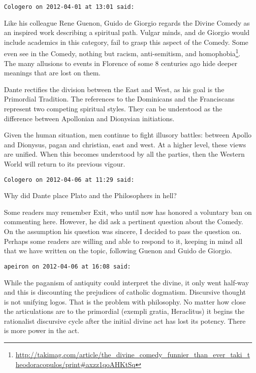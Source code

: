 \begin{footnotesize}
\begin{sffamily}
\hfill

\texttt{Cologero on 2012-04-01 at 13:01 said: }

Like his colleague Rene Guenon, Guido de Giorgio regards the Divine Comedy as an inspired work describing a spiritual path. Vulgar minds, and de Giorgio would include academics in this category, fail to grasp this aspect of the Comedy. Some even see in the Comedy, nothing but racism, anti-semitism, and homophobia\footnote{\url{http://takimag.com/article/the_divine_comedy_funnier_than_ever_taki_theodoracopulos/print\#axzz1qoAHKtSq}}. The many allusions to events in Florence of some 8 centuries ago hide deeper meanings that are lost on them.

Dante rectifies the division between the East and West, as his goal is the Primordial Tradition. The references to the Dominicans and the Franciscans represent two competing spiritual styles. They can be understood as the difference between Apollonian and Dionysian initiations.

Given the human situation, men continue to fight illusory battles: between Apollo and Dionysus, pagan and christian, east and west. At a higher level, these views are unified. When this becomes understood by all the parties, then the Western World will return to its previous vigour.


\hfill

\texttt{Cologero on 2012-04-06 at 11:29 said: }

Why did Dante place Plato and the Philosophers in hell?

Some readers may remember Exit, who until now has honored a voluntary ban on commenting here. However, he did ask a pertinent question about the Comedy. On the assumption his question was sincere, I decided to pass the question on. Perhaps some readers are willing and able to respond to it, keeping in mind all that we have written on the topic, following Guenon and Guido de Giorgio.


\hfill

\texttt{apeiron on 2012-04-06 at 16:08 said: }

While the paganism of antiquity could interpret the divine, it only went half-way and this is discounting the prejudices of catholic dogmatism. Discursive thought is not unifying logos. That is the problem with philosophy. No matter how close the articulations are to the primordial (exempli gratia, Heraclitus) it begins the rationalist discursive cycle after the initial divine act has lost its potency. There is more power in the act.



\end{sffamily}
\end{footnotesize}
